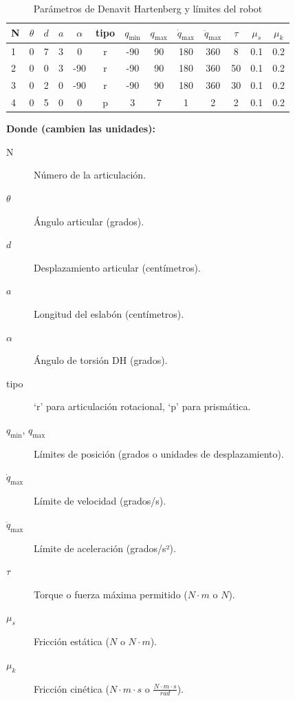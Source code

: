 \begin{table}[ht]
	\centering
	\caption{Parámetros de Denavit Hartenberg y límites del robot}
	\label{tab:parametros_robot}
	\begin{tabular}{ l|cccccccccccc
		}
		\toprule
		N & {$\theta$} & {$d$} & {$a$} & {$\alpha$} & {tipo} 
		& {$q_{\min}$} & {$q_{\max}$} 
		& {$\dot q_{\max}$} & {$\ddot q_{\max}$} 
		& {$\tau$} & {$\mu_s$} & {$\mu_k$} \\
		\midrule
		1 & 0 & 7 & 3  & 0   & r & -90 & 90 & 180 & 360 &  8  & 0.1 & 0.2 \\
		2 & 0 & 0 & 3  & -90 & r & -90 & 90 & 180 & 360 & 50  & 0.1 & 0.2 \\
		3 & 0 & 2 & 0  & -90 & r & -90 & 90 & 180 & 360 & 30  & 0.1 & 0.2 \\
		4 & 0 & 5 & 0  & 0   & p &   3 &  7 &   1 &   2 & 2  & 0.1 & 0.2 \\
		\bottomrule
	\end{tabular}
\end{table}
\bigskip
\noindent
\textbf{Donde (cambien las unidades):}
\begin{description}
	\item[N] Número de la articulación.
	\item[\(\theta\)] Ángulo articular (grados).
	\item[\(d\)] Desplazamiento articular (centímetros).
	\item[\(a\)] Longitud del eslabón (centímetros).
	\item[\(\alpha\)] Ángulo de torsión DH (grados).
	\item[tipo] ‘r’ para articulación rotacional, ‘p’ para prismática.
	\item[\(q_{\min}\), \(q_{\max}\)] Límites de posición (grados o unidades de desplazamiento).
	\item[\(\dot q_{\max}\)] Límite de velocidad (grados/s).
	\item[\(\ddot q_{\max}\)] Límite de aceleración (grados/s²).
	\item[\(\tau\)] Torque o fuerza máxima permitido (\(N \cdot m\) o \(N\)).
	\item[\(\mu_s\)] Fricción estática (\(N\) o \(N \cdot m\)).
	\item[\(\mu_k\)] Fricción cinética (\(N \cdot m \cdot s\) o \(\frac{N \cdot m \cdot s}{rad}\)).
\end{description}

